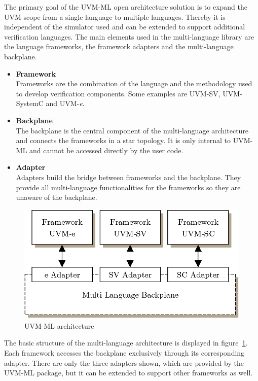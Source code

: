The primary goal of the UVM-ML open architecture solution is to expand the UVM scope from a single language to multiple
languages. Thereby it is independent of the simulator used and can be extended to support additional verification
languages. The main elements used in the multi-language library are the language frameworks, the framework adapters and
the multi-language backplane.
\begin{itemize}
  \item\textbf{Framework}\\
  Frameworks are the combination of the language and the methodology used to develop verification components. Some
  examples are UVM-SV, UVM-SystemC and UVM-\textit{e}.
  \item\textbf{Backplane}\\
  The backplane is the central component of the multi-language architecture and connects the frameworks in a star
  topology.
  It is only internal to UVM-ML and cannot be accessed directly by the user code.
  \item\textbf{Adapter}\\
  Adapters build the bridge between frameworks and the backplane. They provide all multi-language functionalities for
  the frameworks so they are unaware of the backplane.
\end{itemize}

\begin{figure}[htb]
 \centering
 \includegraphics[scale=0.3]{abb/UVM_ML_architecture}
 \caption{UVM-ML architecture}
\label{fig:UVM_ML_architecture}
\end{figure}

The basic structure of the multi-language architecture is displayed in figure~\ref{fig:UVM_ML_architecture}. Each
framework accesses the backplane exclusively through its corresponding adapter. There are only the three adapters shown,
which are provided by the UVM-ML package, but it can be extended to support other frameworks as well.

